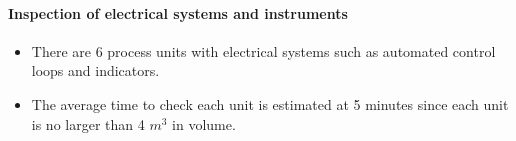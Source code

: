 \paragraph{Inspection of electrical systems and instruments}
    \begin{itemize}
        \item There are 6 process units with electrical systems such as automated control loops and indicators.
        \item The average time to check each unit is estimated at 5 minutes since each unit is no larger than 4 $m^3$ in volume.
        \ite
    \end{itemize}